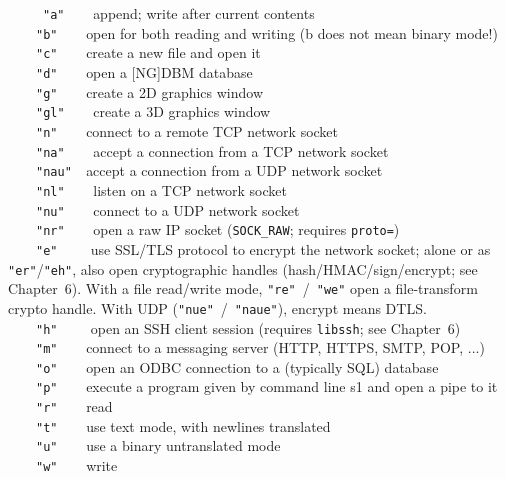 \ \ \ \ \ \texttt{"a"\ \ \ \ }append; write
after current contents\\
 \ \ \ \ \texttt{"b"\ \ \ \ }open for both
reading and writing (b does not mean binary mode!)\\
 \ \ \ \ \texttt{"c"\ \ \ \ }create a new
file and open it\\
 \ \ \ \ \texttt{"d"\ \ \ \ }open a
[NG]DBM database\\
 \ \ \ \ \texttt{"g"\ \ \ \ }create a 2D
graphics window\\
 \ \ \ \ \texttt{"gl"\ \ \ \ }create a 3D
graphics window\\
 \ \ \ \ \texttt{"n"\ \ \ \ }connect to a
remote TCP network socket\\
 \ \ \ \ \texttt{"na"\ \ \ \ }accept a
connection from a TCP network socket \\
 \ \ \ \ \texttt{"nau"\ \ }accept a
connection from a UDP network socket\\
 \ \ \ \ \texttt{"nl"\ \ \ \ }listen on a
TCP network socket \\
 \ \ \ \ \texttt{"nu"\ \ \ \ }connect to a
UDP network socket\\
 \ \ \ \ \texttt{"nr"\ \ \ \ }open a raw
IP socket (\texttt{SOCK\_RAW}; requires \texttt{proto=})\\
 \ \ \ \ \texttt{"e"\ \ \ \ } use SSL/TLS protocol to
encrypt the network socket; alone or as
\texttt{"er"}/\texttt{"eh"}, also open cryptographic
handles (hash/HMAC/sign/encrypt; see Chapter~6).
With a file read/write mode, \texttt{"re"}~/~\texttt{"we"} open a
file-transform crypto handle. With UDP
(\texttt{"nue"}~/~\texttt{"naue"}), encrypt means DTLS.\\
 \ \ \ \ \texttt{"h"\ \ \ \ } open an SSH client
session (requires \texttt{libssh}; see Chapter~6)\\
 \ \ \ \ \texttt{"m"\ \ \ \ }connect to a
messaging server (HTTP, HTTPS, SMTP, POP, ...)\\
 \ \ \ \ \texttt{"o"\ \ \ \ }open an
ODBC connection to a (typically SQL)
database\\
 \ \ \ \ \texttt{"p"\ \ \ \ }execute a
program given by command line s1 and open a pipe to it\\
 \ \ \ \ \texttt{"r"\ \ \ \ }read\\
 \ \ \ \ \texttt{"t"\ \ \ \ }use text mode,
with newlines translated\\
 \ \ \ \ \texttt{"u"\ \ \ \ }use a binary
untranslated mode\\
 \ \ \ \ \texttt{"w"\ \ \ \ }write

